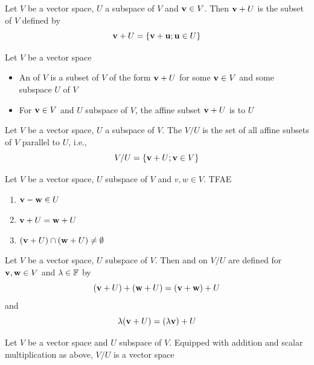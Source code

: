 \documentclass[aspectratio=169]{beamer}
\begin{document}
\begin{frame}
\begin{definition}[$\bv+U$]
Let $V$ be a vector space, $U$ a subspace of $V$ and $\mathbf{v}\in V$. Then $\bv+U$ is the subset of $V$ defined by
\[
\mathbf{v}+U=\{
\mathbf{v}+\mathbf{u}; \mathbf{u}\in U
\}
\]
\end{definition}
\vfill
\begin{definition}
Let $V$ be a vector space
\begin{itemize}
\item An  of $V$ is a subset of $V$ of the form $\bv+U$ for some $\mathbf{v}\in V$ and some subspace $U$ of $V$
\item For $\mathbf{v}\in V$ and $U$ subspace of $V$, the affine subset $\bv+U$ is  to $U$
\end{itemize}
\end{definition}
\end{frame}

\begin{frame}
\begin{definition}\label{def:quotient_space}
Let $V$ be a vector space, $U$ a subspace of $V$. The  $V/U$ is the set of all affine subsets of $V$ parallel to $U$, i.e.,
\[
V/U=\{\mathbf{v}+U;\mathbf{v}\in V\}
\]
\end{definition}
\vfill
\begin{theorem}
Let $V$ be a vector space, $U$ subspace of $V$ and $v,w\in V$. TFAE
\begin{enumerate}
\item $\mathbf{v}-\mathbf{w}\in U$
\item $\mathbf{v}+U=\mathbf{w}+U$
\item $(\mathbf{v}+U)\cap (\mathbf{w}+U)\neq \emptyset$
\end{enumerate}
\end{theorem}
\end{frame}

\begin{frame}
\begin{definition}
Let $V$ be a vector space, $U$ subspace of $V$. Then  and  on $V/U$ are defined for $\mathbf{v},\mathbf{w}\in V$ and $\lambda\in\mathbb{F}$ by
\[
(\mathbf{v}+U)+(\mathbf{w}+U)=(\mathbf{v}+\mathbf{w})+U
\]
and
\[
\lambda(\mathbf{v}+U)=(\lambda \mathbf{v})+U
\]
\end{definition}
\vfill
\begin{importanttheorem}
Let $V$ be a vector space and $U$ subspace of $V$. Equipped with addition and scalar multiplication as above, $V/U$ is a vector space
\end{importanttheorem}
\end{frame}
\end{document}
